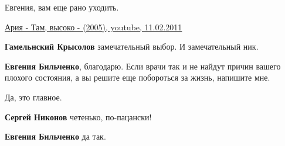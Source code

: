\begin{itemize}
Евгения, вам еще рано уходить.

\href{https://www.youtube.com/watch?v=gGus6zeWfsA}{%
Ария - Там, высоко - (2005), youtube, 11.02.2011%
}

\begin{itemize}
 
\textbf{Гамельнский Крысолов} замечательный выбор. И замечательный ник.

 
\textbf{Евгения Бильченко}, благодарю. Если врачи так и не найдут причин вашего
плохого состояния, а вы решите еще побороться за жизнь, напишите мне.
\end{itemize}

 
Да, это главное.

\begin{itemize}
 
\textbf{Сергей Никонов} четенько, по-пацански!

 
\textbf{Евгения Бильченко} да так.

 

\end{itemize}
\end{itemize}
